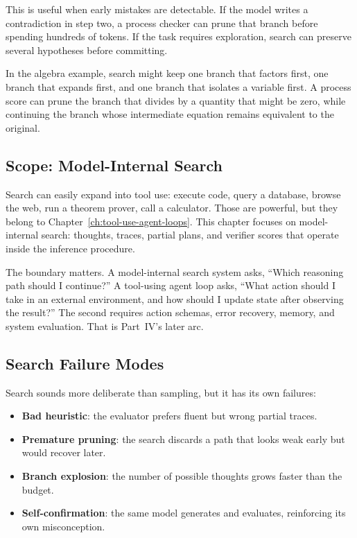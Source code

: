 This is useful when early mistakes are detectable. If the model writes a contradiction in step two, a process checker can prune that branch before spending hundreds of tokens. If the task requires exploration, search can preserve several hypotheses before committing.

In the algebra example, search might keep one branch that factors first, one branch that expands first, and one branch that isolates a variable first. A process score can prune the branch that divides by a quantity that might be zero, while continuing the branch whose intermediate equation remains equivalent to the original.

\subsection{Scope: Model-Internal Search}

Search can easily expand into tool use: execute code, query a database, browse the web, run a theorem prover, call a calculator. Those are powerful, but they belong to Chapter~\ref{ch:tool-use-agent-loops}. This chapter focuses on model-internal search: thoughts, traces, partial plans, and verifier scores that operate inside the inference procedure.

The boundary matters. A model-internal search system asks, ``Which reasoning path should I continue?'' A tool-using agent loop asks, ``What action should I take in an external environment, and how should I update state after observing the result?'' The second requires action schemas, error recovery, memory, and system evaluation. That is Part~IV's later arc.

\subsection{Search Failure Modes}

Search sounds more deliberate than sampling, but it has its own failures:

\begin{itemize}[nosep]
  \item \textbf{Bad heuristic}: the evaluator prefers fluent but wrong partial traces.
  \item \textbf{Premature pruning}: the search discards a path that looks weak early but would recover later.
  \item \textbf{Branch explosion}: the number of possible thoughts grows faster than the budget.
  \item \textbf{Self-confirmation}: the same model generates and evaluates, reinforcing its own misconception.
\end{itemize}

